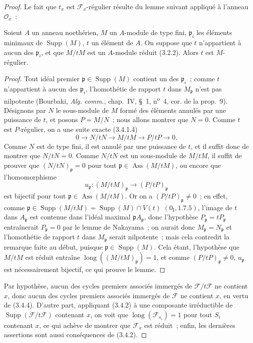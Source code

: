 \begin{proof}
Le fait que $t_x$ est $\mathcal F_x$-régulier résulte du lemme suivant appliqué
à l'anneau $\mathcal O_x$~:

\begin{lemma}[3.4.6.1]
\label{IV.2.3.4.6.1-fr}
Soient $A$ un anneau noethérien, $M$ un $A$-module de type fini,
$\mathfrak p_i$ les éléments minimaux de $\operatorname{Supp}(M)$, $t$ un
élément de $A$. On suppose que $t$ n'appartient à aucun des $\mathfrak p_i$,
et que $M/tM$ est un $A$-module réduit (3.2.2). Alors $t$ est $M$-régulier.
\end{lemma}

\begin{proof}
Tout idéal premier $\mathfrak p\in\operatorname{Supp}(M)$ contient un des
$\mathfrak p_i$~; comme $t$ n'appartient à aucun des $\mathfrak p_i$,
l'homothétie de rapport $t$ dans $M_{\mathfrak p}$ n'est pas nilpotente
(Bourbaki, \emph{Alg. comm.}, chap.~IV, \S~1, n\textsuperscript{o}~4, cor. de
la prop.~9). Désignons par $N$ le sous-module de $M$ formé des éléments
annulés par une puissance de $t$, et posons $P=M/N$~; nous allons montrer que
$N=0$. Comme $t$ est $P$-régulier, on a une suite exacte (3.4.1.4)
\[
0\longrightarrow N/tN\longrightarrow M/tM\longrightarrow P/tP
\longrightarrow0.
\]
Comme $N$ est de type fini, il est annulé par une puissance de $t$, et il
suffit donc de montrer que $N/tN=0$. Comme $N/tN$ est un sous-module de
$M/tM$, il suffit de prouver que $(N/tN)_{\mathfrak p}=0$ pour tout
$\mathfrak p\in\operatorname{Ass}(M/tM)$, ou encore que l'homomorphisme
\[
u_{\mathfrak p}:(M/tM)_{\mathfrak p}\longrightarrow(P/tP)_{\mathfrak p}
\]
est bijectif pour tout $\mathfrak p\in\operatorname{Ass}(M/tM)$. Or on a
$(P/tP)_{\mathfrak p}\neq0$~; en effet, comme
$\mathfrak p\in\operatorname{Supp}(M/tM)
=\operatorname{Supp}(M)\cap V(t)$ $(0_{\mathrm I},1.7.5)$, l'image de $t$ dans
$A_{\mathfrak p}$ est contenue dans l'idéal maximal
$\mathfrak pA_{\mathfrak p}$, donc l'hypothèse
$P_{\mathfrak p}=tP_{\mathfrak p}$ entraînerait $P_{\mathfrak p}=0$ par le
lemme de Nakayama~; on aurait donc $M_{\mathfrak p}=N_{\mathfrak p}$ et
l'homothétie de rapport $t$ dans $M_{\mathfrak p}$ serait nilpotente~; mais
cela contredit la remarque faite au début, puisque
$\mathfrak p\in\operatorname{Supp}(M)$. Cela étant, l'hypothèse que $M/tM$ est
réduit entraîne $\operatorname{long}((M/tM)_{\mathfrak p})=1$, et comme
$(P/tP)_{\mathfrak p}\neq0$, $u_{\mathfrak p}$ est nécessairement bijectif,
ce qui prouve le lemme.
\end{proof}

Par hypothèse, aucun des cycles premiers associés immergés de
$\mathcal F/t\mathcal F$ ne contient $x$, donc aucun des cycles premiers
associés immergés de $\mathcal F$ ne contient $x$, en vertu de (3.4.4).
D'autre part, appliquant (3.4.2) à une composante irréductible de
$\operatorname{Supp}(\mathcal F/t\mathcal F)$ contenant $x$, on voit que
$\operatorname{long}(\mathcal F_{s_i})=1$ pour tout $S_i$ contenant $x$, ce
qui achève de montrer que $\mathcal F_x$ est réduit~; enfin, les dernières
assertions sont aussi conséquences de (3.4.2).
\end{proof}

